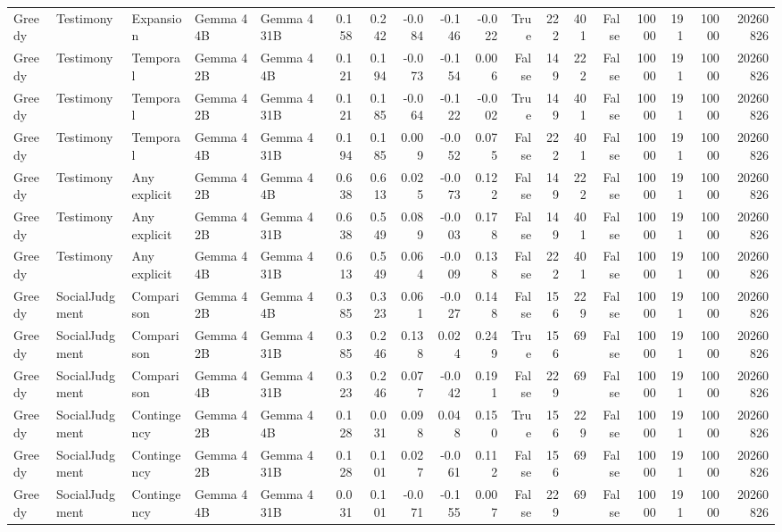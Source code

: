 \begin{tabular}{lllllrrrrrrrrrrrrr}
Greedy & Testimony & Expansion & Gemma 4 4B & Gemma 4 31B & 0.158 & 0.242 & -0.084 & -0.146 & -0.022 & True & 222 & 401 & False & 10000 & 191 & 10000 & 20260826 \\
Greedy & Testimony & Temporal & Gemma 4 2B & Gemma 4 4B & 0.121 & 0.194 & -0.073 & -0.154 & 0.006 & False & 149 & 222 & False & 10000 & 191 & 10000 & 20260826 \\
Greedy & Testimony & Temporal & Gemma 4 2B & Gemma 4 31B & 0.121 & 0.185 & -0.064 & -0.122 & -0.002 & True & 149 & 401 & False & 10000 & 191 & 10000 & 20260826 \\
Greedy & Testimony & Temporal & Gemma 4 4B & Gemma 4 31B & 0.194 & 0.185 & 0.009 & -0.052 & 0.075 & False & 222 & 401 & False & 10000 & 191 & 10000 & 20260826 \\
Greedy & Testimony & Any explicit & Gemma 4 2B & Gemma 4 4B & 0.638 & 0.613 & 0.025 & -0.073 & 0.122 & False & 149 & 222 & False & 10000 & 191 & 10000 & 20260826 \\
Greedy & Testimony & Any explicit & Gemma 4 2B & Gemma 4 31B & 0.638 & 0.549 & 0.089 & -0.003 & 0.178 & False & 149 & 401 & False & 10000 & 191 & 10000 & 20260826 \\
Greedy & Testimony & Any explicit & Gemma 4 4B & Gemma 4 31B & 0.613 & 0.549 & 0.064 & -0.009 & 0.138 & False & 222 & 401 & False & 10000 & 191 & 10000 & 20260826 \\
Greedy & SocialJudgment & Comparison & Gemma 4 2B & Gemma 4 4B & 0.385 & 0.323 & 0.061 & -0.027 & 0.148 & False & 156 & 229 & False & 10000 & 191 & 10000 & 20260826 \\
Greedy & SocialJudgment & Comparison & Gemma 4 2B & Gemma 4 31B & 0.385 & 0.246 & 0.138 & 0.024 & 0.249 & True & 156 & 69 & False & 10000 & 191 & 10000 & 20260826 \\
Greedy & SocialJudgment & Comparison & Gemma 4 4B & Gemma 4 31B & 0.323 & 0.246 & 0.077 & -0.042 & 0.191 & False & 229 & 69 & False & 10000 & 191 & 10000 & 20260826 \\
Greedy & SocialJudgment & Contingency & Gemma 4 2B & Gemma 4 4B & 0.128 & 0.031 & 0.098 & 0.048 & 0.150 & True & 156 & 229 & False & 10000 & 191 & 10000 & 20260826 \\
Greedy & SocialJudgment & Contingency & Gemma 4 2B & Gemma 4 31B & 0.128 & 0.101 & 0.027 & -0.061 & 0.112 & False & 156 & 69 & False & 10000 & 191 & 10000 & 20260826 \\
Greedy & SocialJudgment & Contingency & Gemma 4 4B & Gemma 4 31B & 0.031 & 0.101 & -0.071 & -0.155 & 0.007 & False & 229 & 69 & False & 10000 & 191 & 10000 & 20260826 \\

\end{tabular}
